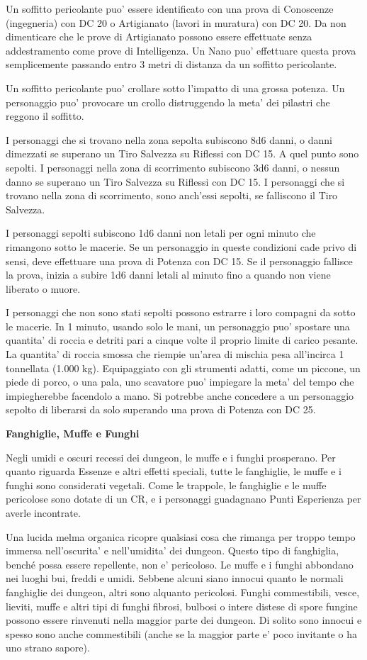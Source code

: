 \documentclass[a4paper,11pt,twoside,openany]{book}
\begin{document}
{Un soffitto pericolante puo' essere identificato con una prova di Conoscenze (ingegneria) con DC 20 o Artigianato (lavori in muratura) con DC 20. Da non dimenticare che le prove di Artigianato possono essere effettuate senza addestramento come prove di Intelligenza. Un Nano puo' effettuare questa prova semplicemente passando entro 3 metri di distanza da un soffitto pericolante. 

Un soffitto pericolante puo' crollare sotto l'impatto di una grossa potenza. Un personaggio puo' provocare un crollo distruggendo la meta' dei pilastri che reggono il soffitto.

I personaggi che si trovano nella zona sepolta subiscono 8d6 danni, o danni dimezzati se superano un Tiro Salvezza su Riflessi con DC 15. A quel punto sono sepolti. I personaggi nella zona di scorrimento subiscono 3d6 danni, o nessun danno se superano un Tiro Salvezza su Riflessi con DC 15. I personaggi che si trovano nella zona di scorrimento, sono anch'essi sepolti, se falliscono il Tiro Salvezza.

I personaggi sepolti subiscono 1d6 danni non letali per ogni minuto che rimangono sotto le macerie. Se un personaggio in queste condizioni cade privo di sensi, deve effettuare una prova di Potenza con DC 15. Se il personaggio fallisce la prova, inizia a subire 1d6 danni letali al minuto fino a quando non viene liberato o muore.

I personaggi che non sono stati sepolti possono estrarre i loro compagni da sotto le macerie. In 1 minuto, usando solo le mani, un personaggio puo' spostare una quantita' di roccia e detriti pari a cinque volte il proprio limite di carico pesante. La quantita' di roccia smossa che riempie un'area di mischia pesa all'incirca 1 tonnellata (1.000 kg). Equipaggiato con gli strumenti adatti, come un piccone, un piede di porco, o una pala, uno scavatore puo' impiegare la meta' del tempo che impiegherebbe facendolo a mano. Si potrebbe anche concedere a un personaggio sepolto di liberarsi da solo superando una prova di Potenza con DC 25.

\textbf{Fanghiglie, Muffe e Funghi}

Negli umidi e oscuri recessi dei dungeon, le muffe e i funghi prosperano. Per quanto riguarda Essenze e altri effetti speciali, tutte le fanghiglie, le muffe e i funghi sono considerati vegetali. Come le trappole, le fanghiglie e le muffe pericolose sono dotate di un CR, e i personaggi guadagnano Punti Esperienza per averle incontrate.

Una lucida melma organica ricopre qualsiasi cosa che rimanga per troppo tempo immersa nell'oscurita' e nell'umidita' dei dungeon. Questo tipo di fanghiglia, benché possa essere repellente, non e' pericoloso. Le muffe e i funghi abbondano nei luoghi bui, freddi e umidi. Sebbene alcuni siano innocui quanto le normali fanghiglie dei dungeon, altri sono alquanto pericolosi. Funghi commestibili, vesce, lieviti, muffe e altri tipi di funghi fibrosi, bulbosi o intere distese di spore fungine possono essere rinvenuti nella maggior parte dei dungeon. Di solito sono innocui e spesso sono anche commestibili (anche se la maggior parte e' poco invitante o ha uno strano sapore).

}
\end{document}
